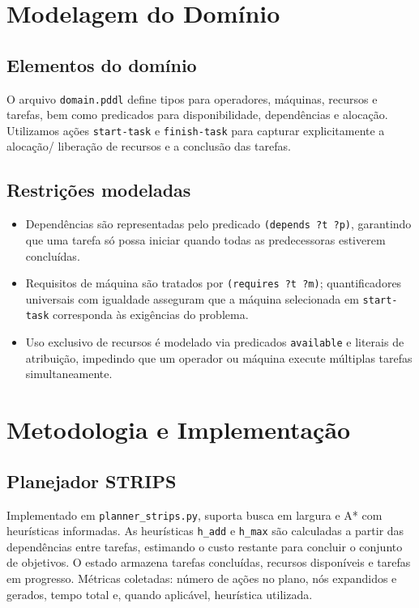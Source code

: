 \documentclass[12pt]{article}
\begin{document}
\section{Modelagem do Domínio}
\subsection{Elementos do domínio}
O arquivo \texttt{domain.pddl} define tipos para operadores, máquinas, recursos e tarefas, bem como predicados para disponibilidade, dependências e alocação. Utilizamos ações \texttt{start-task} e \texttt{finish-task} para capturar explicitamente a alocação/ liberação de recursos e a conclusão das tarefas.

\subsection{Restrições modeladas}
\begin{itemize}
  \item Dependências são representadas pelo predicado \texttt{(depends ?t ?p)}, garantindo que uma tarefa só possa iniciar quando todas as predecessoras estiverem concluídas.
  \item Requisitos de máquina são tratados por \texttt{(requires ?t ?m)}; quantificadores universais com igualdade asseguram que a máquina selecionada em \texttt{start-task} corresponda às exigências do problema.
  \item Uso exclusivo de recursos é modelado via predicados \texttt{available} e literais de atribuição, impedindo que um operador ou máquina execute múltiplas tarefas simultaneamente.
\end{itemize}

\section{Metodologia e Implementação}
\subsection{Planejador STRIPS}
Implementado em \texttt{planner\_strips.py}, suporta busca em largura e A* com heurísticas informadas. As heurísticas \texttt{h\_add} e \texttt{h\_max} são calculadas a partir das dependências entre tarefas, estimando o custo restante para concluir o conjunto de objetivos. O estado armazena tarefas concluídas, recursos disponíveis e tarefas em progresso. Métricas coletadas: número de ações no plano, nós expandidos e gerados, tempo total e, quando aplicável, heurística utilizada.
\end{document}
